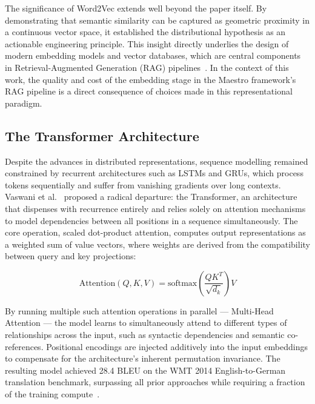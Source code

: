 The significance of Word2Vec extends well beyond the paper itself. By
demonstrating that semantic similarity can be captured as geometric proximity
in a continuous vector space, it established the distributional hypothesis as
an actionable engineering principle. This insight directly underlies the design
of modern embedding models and vector databases, which are central components
in Retrieval-Augmented Generation (RAG) pipelines~\cite{lewis2020rag}. In the
context of this work, the quality and cost of the embedding stage in the
Maestro framework's RAG pipeline is a direct consequence of choices made in
this representational paradigm.

\subsection{The Transformer Architecture}
\label{sec:transformer}

Despite the advances in distributed representations, sequence modelling
remained constrained by recurrent architectures such as LSTMs and GRUs, which
process tokens sequentially and suffer from vanishing gradients over long
contexts. Vaswani et al.~\cite{vaswani2017attention} proposed a radical
departure: the Transformer, an architecture that dispenses with recurrence
entirely and relies solely on attention mechanisms to model dependencies between
all positions in a sequence simultaneously. The core operation, scaled
dot-product attention, computes output representations as a weighted sum of
value vectors, where weights are derived from the compatibility between query
and key projections:

\[
\text{Attention}(Q, K, V) = \text{softmax}\!\left(\frac{QK^{T}}{\sqrt{d_k}}
\right)V
\]

By running multiple such attention operations in parallel --- Multi-Head
Attention --- the model learns to simultaneously attend to different types of
relationships across the input, such as syntactic dependencies and semantic
co-references. Positional encodings are injected additively into the input
embeddings to compensate for the architecture's inherent permutation
invariance. The resulting model achieved 28.4 BLEU on the WMT 2014
English-to-German translation benchmark, surpassing all prior approaches while
requiring a fraction of the training compute~\cite{vaswani2017attention}.


